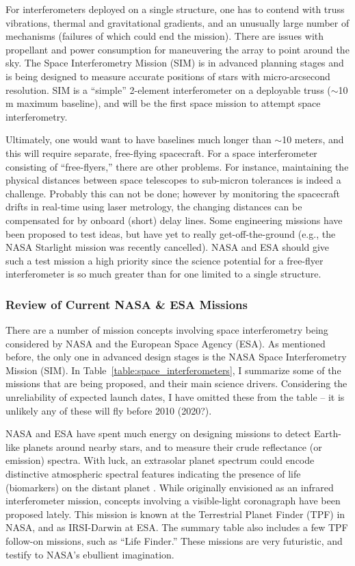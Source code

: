 \documentclass[12pt]{article}
\begin{document}
For interferometers deployed on a single structure, one has to contend
with truss vibrations, thermal and gravitational gradients, and an
unusually large number of mechanisms (failures of which could end the
mission).  There are issues with propellant and power consumption for
maneuvering the array to point around the sky.  The Space
Interferometry Mission (SIM) is in advanced planning stages and is
being designed to measure accurate positions of stars with
micro-arcsecond resolution.  SIM is a ``simple'' 2-element
interferometer on a deployable truss ($\sim$10\,m maximum baseline),
and will be the first space mission to attempt space interferometry.

Ultimately, one would want to have baselines much longer than $\sim$10
meters, and this will require separate, free-flying spacecraft.  For a
space interferometer consisting of ``free-flyers,'' there are other
problems.  For instance, maintaining the physical distances between
space telescopes to sub-micron tolerances is indeed a challenge.
Probably this can not be done; however by monitoring the spacecraft
drifts in real-time using laser metrology, the changing distances can
be compensated for by onboard (short) delay lines.  Some engineering
missions have been proposed to test ideas, but have yet to really
get-off-the-ground (e.g., the NASA Starlight mission was recently
cancelled).  NASA and ESA should give such a test mission a high
priority since the science potential for a free-flyer interferometer
is so much greater than for one limited to a single structure.


\subsubsection{Review of Current NASA \& ESA Missions}
There are a number of mission concepts involving space interferometry
being considered by NASA and the European Space Agency (ESA). As
mentioned before, the only one in advanced design stages is the NASA
Space Interferometry Mission (SIM).  In
Table~\ref{table:space_interferometers}, I summarize some of the
missions that are being proposed, and their main science drivers.
Considering the unreliability of expected launch dates, I have omitted
these from the table -- it is unlikely any of these will fly before 2010 (2020?).

NASA and ESA have spent much energy on designing missions to detect
Earth-like planets around nearby stars, and to measure their crude
reflectance (or emission) spectra.  With luck, an extrasolar planet
spectrum could encode distinctive atmospheric spectral features
indicating the presence of life (biomarkers) on the distant planet
\citep[e.g.,][]{woolf2002}.  While originally envisioned as an
infrared interferometer mission, concepts involving a visible-light
coronagraph have been proposed lately. This mission is known at the
Terrestrial Planet Finder (TPF) in NASA, and as IRSI-Darwin at ESA.
The summary table also includes a few TPF follow-on missions, such as
``Life Finder.''  These missions are very futuristic, and testify to
NASA's ebullient imagination.
\end{document}
